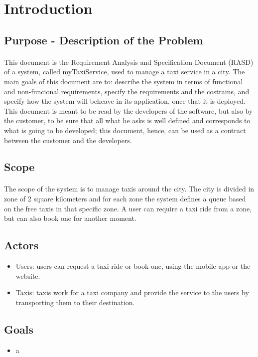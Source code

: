 \section{Introduction}
	\subsection{Purpose - Description of the Problem}
	\paragraph*{}This document is the Requirement Analysis and Specification Document (RASD) of a system, called myTaxiService, used to manage a taxi service in a city. The main goals of this document are to: describe the system in terms of functional and non-funcional requirements, specify the requirements and the costrains, and specify how the system will beheave in its application, once that it is deployed. This document is meant to be read by the developers of the software, but also by the customer, to be sure that all what he asks is well defined and corresponds to what is going to be developed; this document, hence, can be used as a contract between the customer and the developers.
		
	\subsection{Scope}
	\paragraph*{}The scope of the system is to manage taxis around the city. The city is divided in zone of 2 square kilometers and for each zone the system defines a queue based on the free taxis in that specific zone. A user can require a taxi ride from a zone, but can also book one for another moment.
	
	\subsection{Actors}
	\begin{itemize}
		\item Users: users can request a taxi ride or book one, using the mobile app or the website.
		\item Taxis: taxis work for a taxi company and provide the service to the users by transporting them to their destination.
	\end{itemize}
	\subsection{Goals}
	\begin{itemize}
		\item a
	\end{itemize}
